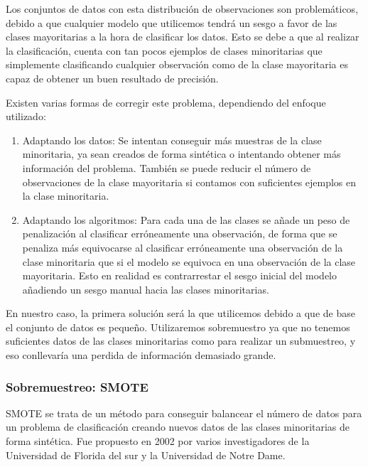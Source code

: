Los conjuntos de datos con esta distribución de observaciones son problemáticos, debido a que cualquier modelo que utilicemos tendrá un sesgo a favor de las clases mayoritarias a la hora de clasificar los datos. Esto se debe a que al realizar la clasificación, cuenta con tan pocos ejemplos de clases minoritarias que simplemente clasificando cualquier observación como de la clase mayoritaria es capaz de obtener un buen resultado de precisión.

Existen varias formas de corregir este problema, dependiendo del enfoque utilizado:

\begin{enumerate}
	\item Adaptando los datos: Se intentan conseguir más muestras de la clase minoritaria, ya sean creados de forma sintética o intentando obtener más información del problema. También se puede reducir el número de observaciones de la clase mayoritaria si contamos con suficientes ejemplos en la clase minoritaria.
	\item Adaptando los algoritmos: Para cada una de las clases se añade un peso de penalización al clasificar erróneamente una observación, de forma que se penaliza más equivocarse al clasificar erróneamente una observación de la clase minoritaria que si el modelo se equivoca en una observación de la clase mayoritaria. Esto en realidad es contrarrestar el sesgo inicial del modelo añadiendo un sesgo manual hacia las clases minoritarias.
\end{enumerate}

En nuestro caso, la primera solución será la que utilicemos debido a que de base el conjunto de datos es pequeño. Utilizaremos sobremuestro ya que no tenemos suficientes datos de las clases minoritarias como para realizar un submuestreo, y eso conllevaría una perdida de información demasiado grande.

\newpage

\subsubsection{Sobremuestreo: SMOTE}

SMOTE \cite{SMOTE} se trata de un método para conseguir balancear el número de datos para un problema de clasificación creando nuevos datos de las clases minoritarias de forma sintética. Fue propuesto en 2002 por varios investigadores de la Universidad de Florida del sur y la Universidad de Notre Dame.

